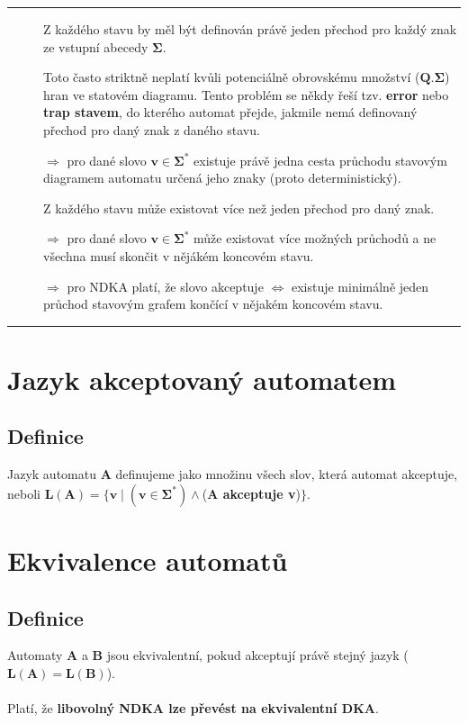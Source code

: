 \documentclass{report}
\begin{document}
\vspace{0.4cm}    
\hrule
\vspace{0.1cm}
\begin{description}
    \item[] Z každého stavu by měl být definován právě jeden přechod pro každý znak ze vstupní abecedy $\mathbf{\Sigma}$. 
    
    Toto často striktně neplatí kvůli potenciálně obrovskému množství ($\mathbf{Q . \Sigma}$) hran ve statovém diagramu. Tento problém se někdy řeší tzv. \textbf{error} nebo \textbf{trap stavem}, do kterého automat přejde, jakmile nemá definovaný přechod pro daný znak z daného stavu.

    $\Rightarrow$ pro dané slovo $\mathbf{v \in \Sigma^*}$ existuje právě jedna cesta průchodu stavovým diagramem automatu určená jeho znaky (proto deterministický).
    
    \item[] Z každého stavu může existovat více než jeden přechod pro daný znak.

    $\Rightarrow$ pro dané slovo $\mathbf{v \in \Sigma^*}$ může existovat více možných průchodů a ne všechna musí skončit v nějákém koncovém stavu.

    
    $\Rightarrow$ pro NDKA platí, že slovo akceptuje $\iff$ existuje minimálně jeden průchod stavovým grafem končící v nějakém koncovém stavu.
\end{description}
\vspace{0.1cm}    
\hrule
\vspace{0.4cm} 

\section{Jazyk akceptovaný automatem}
\subsection*{Definice}
Jazyk automatu \textbf{A} definujeme jako množinu všech slov, která automat akceptuje, neboli $\mathbf{L(A) = \{ v \mid (v \in \Sigma^*) \land }$(\textbf{A akceptuje v})$\mathbf{ \}}$.

\section{Ekvivalence automatů}
\subsection*{Definice}
Automaty \textbf{A} a \textbf{B} jsou ekvivalentní, pokud akceptují právě stejný jazyk ($\mathbf{L(A) = L(B)}$).
\\ \\
Platí, že \textbf{libovolný NDKA lze převést na ekvivalentní DKA}.
\end{document}
